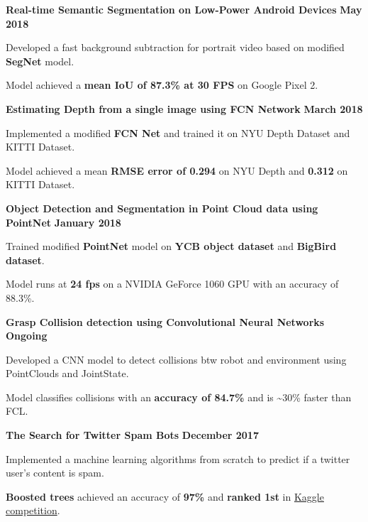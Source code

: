 \documentclass[letterpaper, margin, line, 10.5pt]{resume}
\begin{document}
\begin{resume}
	\textbf{Real-time Semantic Segmentation on Low-Power Android Devices} \hfill \textbf{May 2018}
	\begin{list2}
		\item Developed a fast background subtraction for portrait video based on modified \textbf{SegNet} model.
		\item Model achieved a \textbf{mean IoU of 87.3\% at 30 FPS} on Google Pixel 2.
	\end{list2}\vspace{-3.2mm}

	\textbf{Estimating Depth from a single image using FCN Network} \hfill \textbf{March 2018}
	\begin{list2}
		\item Implemented a modified \textbf{FCN Net} and trained it on NYU Depth Dataset and KITTI Dataset.
		\item Model achieved a mean \textbf{RMSE error of 0.294} on NYU Depth and \textbf{0.312} on KITTI Dataset.
	\end{list2}\vspace{-3.2mm}

	\textbf{Object Detection and Segmentation in Point Cloud data using PointNet} \hfill \textbf{January 2018}
	\begin{list2}
		\item Trained modified \textbf{PointNet} model on \textbf{YCB object dataset} and \textbf{BigBird dataset}.
		\item Model runs at \textbf{24 fps} on a NVIDIA GeForce 1060 GPU with an accuracy of 88.3\%.
	\end{list2}\vspace{-3.2mm}

	\textbf{Grasp Collision detection using Convolutional Neural Networks} \hfill \textbf{Ongoing}
	\begin{list2}
		\item Developed a CNN model to detect collisions btw robot and environment using PointClouds and JointState.
		\item Model classifies collisions with an \textbf{accuracy of 84.7\%} and is \textasciitilde 30\% faster than FCL.
	\end{list2}\vspace{-3.2mm}
	
	\textbf{The Search for Twitter Spam Bots} \hfill \textbf{December 2017}
	\begin{list2}
		\item Implemented a machine learning algorithms from scratch to predict if a twitter user's content is spam.
		\item \textbf{Boosted trees} achieved an accuracy of \textbf{97\%} and \textbf{ranked 1st} in \href{https://www.kaggle.com/c/uofu-ml-fall-2017/leaderboard}{Kaggle competition}.
	\end{list2}\vspace{-3.2mm}


\end{resume}
\end{document}
